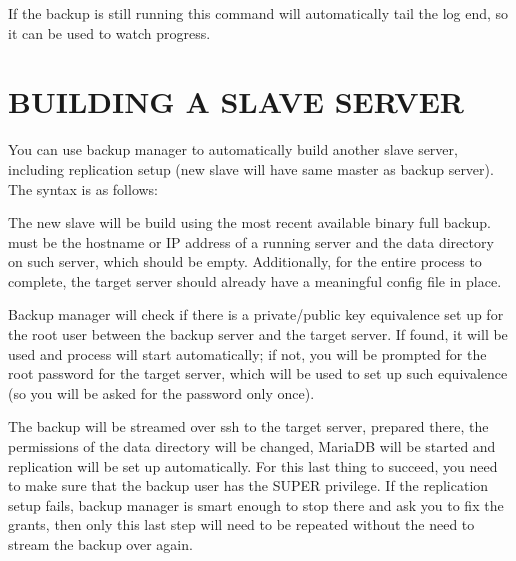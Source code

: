 \documentclass[letterpaper,10pt,english]{sphinxmanual}
\begin{document}
\sphinxAtStartPar
{}

\sphinxAtStartPar
If the backup is still running this command will automatically tail the log end, so it can
be used to watch progress.


\section{BUILDING A SLAVE SERVER}
\label{\detokenize{mariadb-backup-manager:building-a-slave-server}}
\sphinxAtStartPar
You can use backup manager to automatically build another slave server, including replication
setup (new slave will have same master as backup server).
The syntax is as follows:

\sphinxAtStartPar
{}

\sphinxAtStartPar
The new slave will be build using the most recent available binary full backup.
 must be the hostname or IP address of a running server and 
the data directory on such server, which should be empty. Additionally, for the entire
process to complete, the target server should already have a meaningful config file in place.

\sphinxAtStartPar
Backup manager will check if there is a private/public key equivalence set up for the root
user between the backup server and the target server. If found, it will be used and process
will start automatically; if not, you will be prompted for the root password for the target
server, which will be used to set up such equivalence (so you will be asked for the password
only once).

\sphinxAtStartPar
The backup will be streamed over ssh to the target server, prepared there, the permissions of
the data directory will be changed, MariaDB will be started and replication will be set up
automatically. For this last thing to succeed, you need to make sure that the backup user
has the SUPER privilege.  If the replication setup fails, backup manager is smart enough to
stop there and ask you to fix the grants, then only this last step will need to be repeated
without the need to stream the backup over again.
\end{document}
